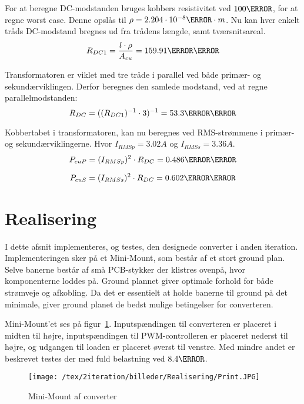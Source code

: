 For at beregne DC-modstanden bruges kobbers resistivitet ved $100\degreeCelsius$, for at regne worst case. Denne opslås til $\rho=2.204\cdot 10^{-8}\ohm \cdot m$. Nu kan hver enkelt tråds DC-modstand bregnes ud fra trådens længde, samt tværsnitsareal.
\begin{equation} \label{dc1-modstand}
R_{DC1} = \frac{l \cdot \rho}{A_{cu}} = 159.91\milli\ohm
\end{equation}

Transformatoren er viklet med tre tråde i parallel ved både primær- og sekundærviklingen. Derfor beregnes den samlede modstand, ved at regne parallelmodstanden:
\begin{equation} \label{dc-modstand}
R_{DC} = ((R_{DC1})^{-1} \cdot 3)^{-1} = 53.3\milli\ohm
\end{equation}

Kobbertabet i transformatoren, kan nu beregnes ved RMS-strømmene i primær- og sekundærviklingerne. Hvor $I_{RMSp} = 3.02A$ og $I_{RMSs} = 3.36A$.
\begin{equation} \label{dc-tab-pri}
P_{cuP} = (I_{RMSp})^2 \cdot R_{DC} = 0.486\milli\watt
\end{equation}

\begin{equation} \label{dc-tab-sek}
P_{cuS} = (I_{RMSs})^2 \cdot R_{DC} = 0.602\milli\watt
\end{equation}



\section{Realisering}
I dette afsnit implementeres, og testes, den designede converter i anden iteration. Implementeringen sker på et Mini-Mount, som består af et stort ground plan. Selve banerne består af små PCB-stykker der klistres ovenpå, hvor komponenterne loddes på. Ground plannet giver optimale forhold for både strømveje og afkobling. Da det er essentielt at holde banerne til ground på det minimale, giver ground planet de bedst mulige betingelser for converteren. 

Mini-Mount'et ses på figur~\ref{fig:Mini_Mount}. Inputspændingen til converteren er placeret i midten til højre, inputspændingen til PWM-controlleren er placeret nederst til højre, og udgangen til loaden er placeret øverst til venstre. Med mindre andet er beskrevet testes der med fuld belastning ved $8.4\ohm$.

\begin{figure}[H]
	\center
	\texttt{[image: /tex/2iteration/billeder/Realisering/Print.JPG]}
	\caption{Mini-Mount af converter}
	\label{fig:Mini_Mount}
\end{figure}


